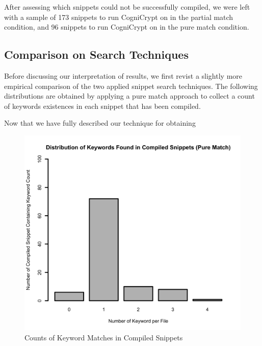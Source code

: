 \documentclass[10pt, conference]{IEEEtran}
\begin{document}
After assessing which snippets could not be successfully compiled, we were left with a sample of 173 snippets to run CogniCrypt on in the partial match condition, and 96 snippets to run CogniCrypt on in the pure match condition. 


\subsection{Comparison on Search Techniques}
Before discussing our interpretation of results, we first revist a slightly more empirical comparison of the two applied snippet search techniques. The following distributions are obtained by applying a pure match approach to collect a count of keywords existences in each snippet that has been compiled.

Now that we have fully described our technique for obtaining 
\begin{figure}[h]
\begin{center}
\includegraphics[width=0.9\linewidth]{CompiledKeywordDistPureMatch.png}
\caption{Counts of Keyword Matches in Compiled Snippets}
\end{center}
\end{figure}
\end{document}
